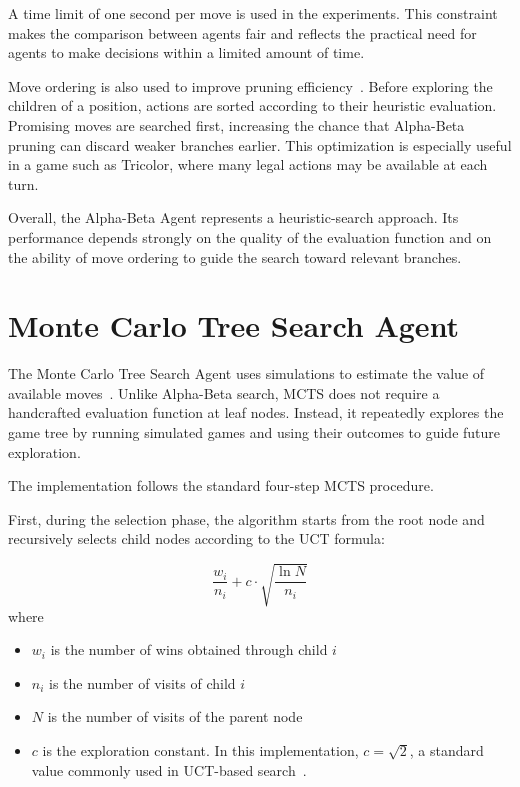A time limit of one second per move is used in the experiments. This constraint makes the comparison between agents fair and reflects the practical need for agents to make decisions within a limited amount of time.

Move ordering is also used to improve pruning efficiency~\cite{russell2010aima}. Before exploring the children of a position, actions are sorted according to their heuristic evaluation. Promising moves are searched first, increasing the chance that Alpha-Beta pruning can discard weaker branches earlier. This optimization is especially useful in a game such as Tricolor, where many legal actions may be available at each turn.

Overall, the Alpha-Beta Agent represents a heuristic-search approach. Its performance depends strongly on the quality of the evaluation function and on the ability of move ordering to guide the search toward relevant branches.

\section{Monte Carlo Tree Search Agent}

The Monte Carlo Tree Search Agent uses simulations to estimate the value of available moves~\cite{russell2010aima}. Unlike Alpha-Beta search, MCTS does not require a handcrafted evaluation function at leaf nodes. Instead, it repeatedly explores the game tree by running simulated games and using their outcomes to guide future exploration.

The implementation follows the standard four-step MCTS procedure.

First, during the selection phase, the algorithm starts from the root node and recursively selects child nodes according to the UCT formula:

\[ \frac{w_i}{n_i} + c \cdot \sqrt{\frac{\ln{N}}{n_i}} \]
where
\begin{itemize}
    \item $w_i$ is the number of wins obtained through child $i$
    \item $n_i$ is the number of visits of child $i$
    \item $N$ is the number of visits of the parent node
    \item $c$ is the exploration constant. In this implementation, $c=\sqrt{2}$, a standard value commonly used in UCT-based search~\cite{swiechowski2023mcts}.
\end{itemize}

